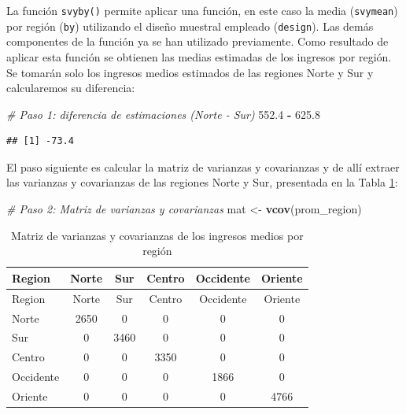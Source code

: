 \documentclass[
  spanish,
  12pt,
]{book}
\newenvironment{Shaded}{\begin{snugshade}}{\end{snugshade}}
\newcommand{\CommentTok}[1]{\textcolor[rgb]{0.56,0.35,0.01}{\textit{#1}}}
\newcommand{\FloatTok}[1]{\textcolor[rgb]{0.00,0.00,0.81}{#1}}
\newcommand{\FunctionTok}[1]{\textcolor[rgb]{0.13,0.29,0.53}{\textbf{#1}}}
\newcommand{\NormalTok}[1]{#1}
\newcommand{\OtherTok}[1]{\textcolor[rgb]{0.56,0.35,0.01}{#1}}
\newcommand{\SpecialCharTok}[1]{\textcolor[rgb]{0.81,0.36,0.00}{\textbf{#1}}}
\begin{document}
La función \texttt{svyby()} permite aplicar una función, en este caso la media (\texttt{svymean}) por región (\texttt{by}) utilizando el diseño muestral empleado (\texttt{design}). Las demás componentes de la función ya se han utilizado previamente. Como resultado de aplicar esta función se obtienen las medias estimadas de los ingresos por región. Se tomarán solo los ingresos medios estimados de las regiones Norte y Sur y calcularemos su diferencia:

\begin{Shaded}
\begin{Highlighting}[]
\CommentTok{\# Paso 1: diferencia de estimaciones (Norte {-} Sur)}
\FloatTok{552.4} \SpecialCharTok{{-}} \FloatTok{625.8}
\end{Highlighting}
\end{Shaded}

\begin{verbatim}
## [1] -73.4
\end{verbatim}

El paso siguiente es calcular la matriz de varianzas y covarianzas y de allí extraer las varianzas y covarianzas de las regiones Norte y Sur, presentada en la Tabla \ref{tab:tab-vcov-region}:

\begin{Shaded}
\begin{Highlighting}[]
\CommentTok{\# Paso 2: Matriz de varianzas y covarianzas}
\NormalTok{mat }\OtherTok{\textless{}{-}} \FunctionTok{vcov}\NormalTok{(prom\_region)}
\end{Highlighting}
\end{Shaded}

\begin{longtable}[]{@{}lccccc@{}}
\caption{\label{tab:tab-vcov-region}Matriz de varianzas y covarianzas de los ingresos medios por región}\tabularnewline
\toprule\noalign{}
Region & Norte & Sur & Centro & Occidente & Oriente \\
\midrule\noalign{}
\endfirsthead
\toprule\noalign{}
Region & Norte & Sur & Centro & Occidente & Oriente \\
\midrule\noalign{}
\endhead
\bottomrule\noalign{}
\endlastfoot
Norte & 2650 & 0 & 0 & 0 & 0 \\
Sur & 0 & 3460 & 0 & 0 & 0 \\
Centro & 0 & 0 & 3350 & 0 & 0 \\
Occidente & 0 & 0 & 0 & 1866 & 0 \\
Oriente & 0 & 0 & 0 & 0 & 4766 \\
\end{longtable}
\end{document}
